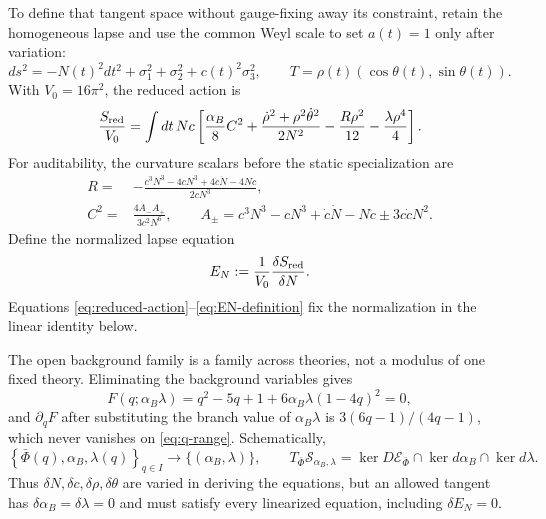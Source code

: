 \documentclass[11pt]{article}
\theoremstyle{definition}
\theoremstyle{remark}
\begin{document}
To define that tangent space without gauge-fixing away its constraint, retain
the homogeneous lapse and use the common Weyl scale to set $a(t)=1$ only
after variation:
\begin{equation}\label{eq:reduced-metric}
 ds^2=-N(t)^2dt^2+\sigma_1^2+\sigma_2^2+c(t)^2\sigma_3^2,
 \qquad T=\rho(t)(\cos\theta(t),\sin\theta(t)).
\end{equation}
With $V_0=16\pi^2$, the reduced action is
\begin{equation}\label{eq:reduced-action}
 \frac{S_{\rm red}}{V_0}=\int dt\,Nc\left[
 \frac{\alpha_B}{8}C^2
+\frac{\dot\rho^2+\rho^2\dot\theta^2}{2N^2}
-\frac{R\rho^2}{12}-\frac{\lambda\rho^4}{4}\right].
\end{equation}
For auditability, the curvature scalars before the static specialization are
\begin{align}
 R={}&-\frac{c^3N^3-4cN^3+4\dot c\dot N-4N\ddot c}
 {2cN^3},\label{eq:reduced-R}\\
 C^2={}&\frac{4A_-A_+}{3c^2N^6},\qquad
 A_\pm=c^3N^3-cN^3+\dot c\dot N-N\ddot c
 \pm3c\dot cN^2.\label{eq:reduced-C2}
\end{align}
Define the normalized lapse equation
\begin{equation}\label{eq:EN-definition}
 E_N:=\frac1{V_0}\frac{\delta S_{\rm red}}{\delta N}.
\end{equation}
Equations \eqref{eq:reduced-action}--\eqref{eq:EN-definition} fix the
normalization in the linear identity below.

The open background family is a family across theories, not a modulus of one
fixed theory.  Eliminating the background variables gives
\begin{equation}\label{eq:coupling-polynomial}
 F(q;\alpha_B\lambda)
 =q^2-5q+1+6\alpha_B\lambda(1-4q)^2=0,
\end{equation}
and $\partial_qF$ after substituting the branch value of
$\alpha_B\lambda$ is
$3(6q-1)/(4q-1)$, which never vanishes on \eqref{eq:q-range}.  Schematically,
\begin{equation}\label{eq:fixed-slice-diagram}
 \left\{\bar\Phi(q),\alpha_B,\lambda(q)\right\}_{q\in I}
 \longrightarrow \{(\alpha_B,\lambda)\},
 \qquad
 T_{\bar\Phi}\mathcal S_{\alpha_B,\lambda}
 =\ker D\mathcal E_{\bar\Phi}\cap
 \ker d\alpha_B\cap\ker d\lambda .
\end{equation}
Thus $\delta N,\delta c,\delta\rho,\delta\theta$ are varied in deriving the
equations, but an allowed tangent has $\delta\alpha_B=\delta\lambda=0$ and
must satisfy every linearized equation, including $\delta E_N=0$.
\end{document}
